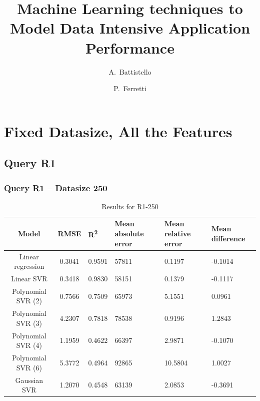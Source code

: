 \documentclass[a4paper,11pt]{article}
\author{A.~Battistello\and P.~Ferretti}
\title{Machine Learning techniques to Model Data Intensive Application Performance}
\date{}
\begin{document}
\maketitle
\tableofcontents


\newpage
\section{Fixed Datasize, All the Features}
\subsection{Query R1}
\subsubsection{Query R1 -- Datasize 250}
\begin{table}[H]
	\centering
	\begin{adjustbox}{center}
		\begin{tabular}{c | c M{1.2cm} M{2.5cm} M{2.5cm} M{1.8cm}}
			Model & RMSE & R\textsuperscript{2} & Mean absolute error & Mean relative error & Mean difference \tabularnewline
			\hline
			Linear regression & 0.3041 & 0.9591 &  57811 & 0.1197 & -0.1014 \\
			Linear SVR & 0.3418 & 0.9830 &  58151 & 0.1379 & -0.1117 \\
			Polynomial SVR (2) & 0.7566 & 0.7509 &  65973 & 5.1551 & 0.0961 \\
			Polynomial SVR (3) & 4.2307 & 0.7818 &  78538 & 0.9196 & 1.2843 \\
			Polynomial SVR (4) & 1.1959 & 0.4622 &  66397 & 2.9871 & -0.1070 \\
			Polynomial SVR (6) & 5.3772 & 0.4964 &  92865 & 10.5804 & 1.0027 \\
			Gaussian SVR & 1.2070 & 0.4548 &  63139 & 2.0853 & -0.3691 \\
		\end{tabular}
	\end{adjustbox}
	\\
	\caption{Results for R1-250}
	\label{fig:all_linear_R1_250}
\end{table}
\end{document}
